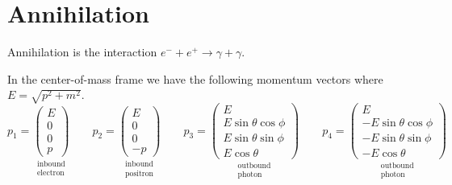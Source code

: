 

\section*{Annihilation}

Annihilation is the interaction $e^-+e^+\rightarrow\gamma+\gamma$.
\begin{center}
\end{center}

In the center-of-mass frame we have the following momentum vectors where $E=\sqrt{p^2+m^2}$.
\begin{equation*}
p_1=\underset{\substack{\text{inbound}\\ \text{electron}}}
{\begin{pmatrix}E\\0\\0\\p\end{pmatrix}}
\qquad
p_2=\underset{\substack{\text{inbound}\\ \text{positron}}}
{\begin{pmatrix}E\\0\\0\\-p\end{pmatrix}}
\qquad
p_3=\underset{\substack{\text{outbound}\\ \text{photon}}}
{\begin{pmatrix}E\\ E\sin\theta\cos\phi\\ E\sin\theta\sin\phi\\ E\cos\theta\end{pmatrix}}
\qquad
p_4=\underset{\substack{\text{outbound}\\ \text{photon}}}
{\begin{pmatrix}E\\ -E\sin\theta\cos\phi\\ -E\sin\theta\sin\phi\\ -E\cos\theta\end{pmatrix}}
\end{equation*}

